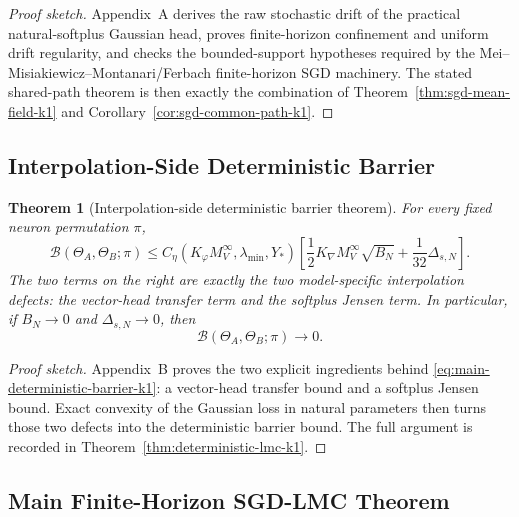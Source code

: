 \documentclass[11pt]{article}
\newtheorem{theorem}{Theorem}
\theoremstyle{definition}
\newcommand{\cB}{\mathcal{B}}
\begin{document}
\begin{proof}[Proof sketch]
Appendix~A derives the raw stochastic drift of the practical natural-softplus
Gaussian head, proves finite-horizon confinement and uniform drift regularity,
and checks the bounded-support hypotheses required by the
Mei--Misiakiewicz--Montanari/Ferbach finite-horizon SGD machinery. The stated
shared-path theorem is then exactly the combination of
Theorem~\ref{thm:sgd-mean-field-k1} and
Corollary~\ref{cor:sgd-common-path-k1}.
\end{proof}

\subsection{Interpolation-Side Deterministic Barrier}

\begin{theorem}[Interpolation-side deterministic barrier theorem]
\label{thm:main-barrier-k1}
For every fixed neuron permutation $\pi$,
\begin{equation}
  \cB(\Theta_A,\Theta_B;\pi)
  \le
  C_\eta(K_\varphi M_V^\infty,\lambda_{\min},Y_\ast)
  \left[
    \frac12 K_{\nabla}M_V^\infty\sqrt{B_N}
    +
    \frac1{32}\Delta_{s,N}
  \right].
  \label{eq:main-deterministic-barrier-k1}
\end{equation}
The two terms on the right are exactly the two model-specific interpolation
defects: the vector-head transfer term and the softplus Jensen term. In
particular, if $B_N\to 0$ and $\Delta_{s,N}\to 0$, then
\[
  \cB(\Theta_A,\Theta_B;\pi)\to 0.
\]
\end{theorem}

\begin{proof}[Proof sketch]
Appendix~B proves the two explicit ingredients behind
\eqref{eq:main-deterministic-barrier-k1}: a vector-head transfer bound and a
softplus Jensen bound. Exact convexity of the Gaussian loss in natural
parameters then turns those two defects into the deterministic barrier bound.
The full argument is recorded in Theorem~\ref{thm:deterministic-lmc-k1}.
\end{proof}

\subsection{Main Finite-Horizon SGD-LMC Theorem}
\end{document}
